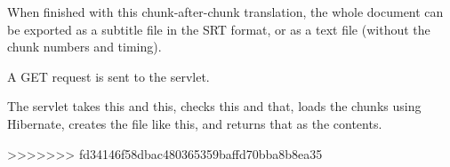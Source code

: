 
When finished with this chunk-after-chunk translation, the whole document can be exported as a subtitle file in the SRT format, or as a text file (without the chunk numbers and timing).

A GET request is sent to the servlet.

The servlet takes this and this, checks this and that, loads the chunks using Hibernate, creates the file like this, and returns that as the contents.

>>>>>>> fd34146f58dbac480365359baffd70bba8b8ea35
